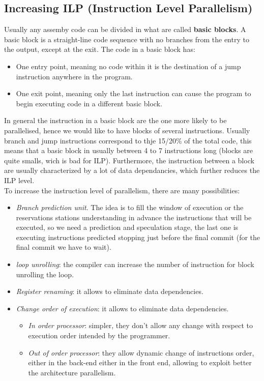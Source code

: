 \subsection{Increasing ILP (Instruction Level Parallelism)}
Usually any assemby code can be divided in what are called \textbf{basic blocks}.
A basic block is a straight-line code sequence with no branches from the entry
to the output, except at the exit.
The code in a basic block has:
\begin{itemize}
  \item One entry point, meaning no code within it is the destination of a jump
    instruction anywhere in the program.
  \item One exit point, meaning only the last instruction can cause the program
    to begin executing code in a different basic block.
\end{itemize}
In general the instruction in a basic block are the one more likely to be
parallelised, hence we would like to have blocks of several instructions.
Usually branch and jump instructions correspond to thje 15/20\% of the total
code, this means that a basic block in usually between 4 to 7 instructions
long (blocks are quite smalls, wich is bad for ILP). Furthermore, the
instruction between a block are usually characterized by a lot of data
dependancies, which further reduces the ILP level.\\ To increase the
instruction level of parallelism, there are many possibilities:
\begin{itemize}
  \item \textit{Branch prediction unit}. The idea is to fill the window of
    execution or the reservations stations understanding in advance the
    instructions that will be executed, so we need a prediction and speculation
    stage, the last one is executing instructions predicted stopping just
    before the final commit (for the final commit we have to wait).
  \item \textit{loop unrolling}: the compiler can increase the number of
    instruction for block unrolling the loop.
  \item \textit{Register renaming}: it allows to eliminate data dependencies.
  \item \textit{Change order of execution}: it allows to eliminate data
    dependencies.
    \begin{itemize}
      \item \textit{In order processor}: simpler, they don't allow any change
        with respect to execution order intended by the programmer.
      \item \textit{Out of order processor}: they allow dynamic change of
        instructions order, either in the back-end either in the front end,
        allowing to exploit better the architecture parallelism.
    \end{itemize}
\end{itemize}

